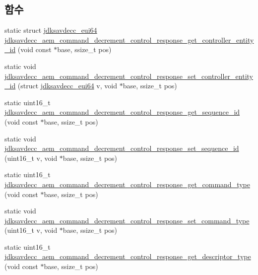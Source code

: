 \subsection*{함수}
\begin{DoxyCompactItemize}
\item 
static struct \hyperlink{structjdksavdecc__eui64}{jdksavdecc\+\_\+eui64} \hyperlink{group__command__decrement__control__response_ga5a79fafed7c849def48aa7a7c286c2f6}{jdksavdecc\+\_\+aem\+\_\+command\+\_\+decrement\+\_\+control\+\_\+response\+\_\+get\+\_\+controller\+\_\+entity\+\_\+id} (void const $\ast$base, ssize\+\_\+t pos)
\item 
static void \hyperlink{group__command__decrement__control__response_ga4417b42f46c4bb3e0001f33b2b64a035}{jdksavdecc\+\_\+aem\+\_\+command\+\_\+decrement\+\_\+control\+\_\+response\+\_\+set\+\_\+controller\+\_\+entity\+\_\+id} (struct \hyperlink{structjdksavdecc__eui64}{jdksavdecc\+\_\+eui64} v, void $\ast$base, ssize\+\_\+t pos)
\item 
static uint16\+\_\+t \hyperlink{group__command__decrement__control__response_ga0ab60f9fc3e43d6dc4f013eb64ad7fa4}{jdksavdecc\+\_\+aem\+\_\+command\+\_\+decrement\+\_\+control\+\_\+response\+\_\+get\+\_\+sequence\+\_\+id} (void const $\ast$base, ssize\+\_\+t pos)
\item 
static void \hyperlink{group__command__decrement__control__response_ga06dc0d4501b55ef8e905f27fb6e349a8}{jdksavdecc\+\_\+aem\+\_\+command\+\_\+decrement\+\_\+control\+\_\+response\+\_\+set\+\_\+sequence\+\_\+id} (uint16\+\_\+t v, void $\ast$base, ssize\+\_\+t pos)
\item 
static uint16\+\_\+t \hyperlink{group__command__decrement__control__response_gadb323aa34836d9a7613fdf538bcc3a01}{jdksavdecc\+\_\+aem\+\_\+command\+\_\+decrement\+\_\+control\+\_\+response\+\_\+get\+\_\+command\+\_\+type} (void const $\ast$base, ssize\+\_\+t pos)
\item 
static void \hyperlink{group__command__decrement__control__response_ga27e97d31641b13c054608ca8420698fe}{jdksavdecc\+\_\+aem\+\_\+command\+\_\+decrement\+\_\+control\+\_\+response\+\_\+set\+\_\+command\+\_\+type} (uint16\+\_\+t v, void $\ast$base, ssize\+\_\+t pos)
\item 
static uint16\+\_\+t \hyperlink{group__command__decrement__control__response_gaea997c36ccd7f65a1caf72de36461c6d}{jdksavdecc\+\_\+aem\+\_\+command\+\_\+decrement\+\_\+control\+\_\+response\+\_\+get\+\_\+descriptor\+\_\+type} (void const $\ast$base, ssize\+\_\+t pos)
\item 

\end{DoxyCompactItemize}
